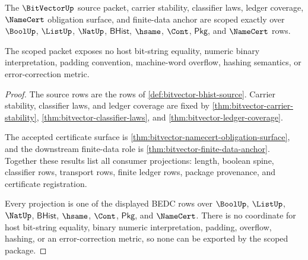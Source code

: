 \begin{theorem}\label{thm:bitvector-scoped-dependency-binding}
The $\BitVectorUp$ source packet, carrier stability, classifier laws, ledger
coverage, $\NameCert$ obligation surface, and finite-data anchor are scoped
exactly over $\BoolUp$, $\ListUp$, $\NatUp$, $\mathsf{BHist}$, $\hsame$,
$\Cont$, $\mathsf{Pkg}$, and $\NameCert$ rows.

The scoped packet exposes no host bit-string equality, numeric binary
interpretation, padding convention, machine-word overflow, hashing semantics,
or error-correction metric.
\end{theorem}
\begin{proof}
The source rows are the rows of \autoref{def:bitvector-bhist-source}. Carrier
stability, classifier laws, and ledger coverage are fixed by
\autoref{thm:bitvector-carrier-stability},
\autoref{thm:bitvector-classifier-laws}, and
\autoref{thm:bitvector-ledger-coverage}.

The accepted certificate surface is
\autoref{thm:bitvector-namecert-obligation-surface}, and the downstream
finite-data role is \autoref{thm:bitvector-finite-data-anchor}. Together these
results list all consumer projections: length, boolean spine, classifier
rows, transport rows, finite ledger rows, package provenance, and certificate
registration.

Every projection is one of the displayed BEDC rows over $\BoolUp$, $\ListUp$,
$\NatUp$, $\mathsf{BHist}$, $\hsame$, $\Cont$, $\mathsf{Pkg}$, and
$\NameCert$. There is no coordinate for host bit-string equality, binary
numeric interpretation, padding, overflow, hashing, or an error-correction
metric, so none can be exported by the scoped package.
\end{proof}

